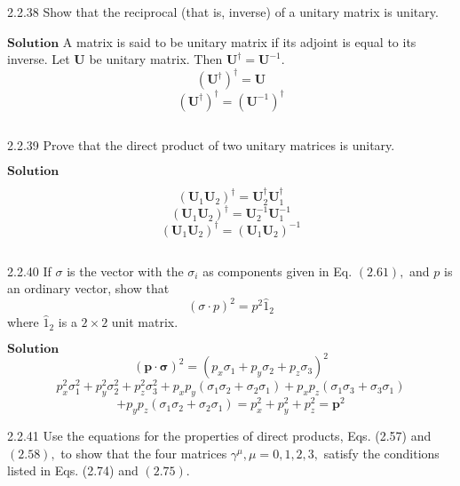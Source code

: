 \begin{mybox}{2.2.38}
Show that the reciprocal (that is, inverse) of a unitary matrix is unitary.
\end{mybox}


$\boxed{\textbf{Solution}}$ A matrix is said to be unitary matrix if its adjoint is equal to its inverse. Let $\mathbf{U}$ be unitary matrix. Then $\mathbf{U}^{\dagger}=\mathbf{U}^{-1}$.
$$\left( \mathbf{U}^{\dagger}\right)^{\dagger}=\mathbf{U}$$
$$\left( \mathbf{U}^{\dagger}\right)^{\dagger}=\left( \mathbf{U}^{-1}\right)^{\dagger}$$

$$$$

\begin{mybox}{2.2.39}
Prove that the direct product of two unitary matrices is unitary.
\end{mybox}

$\boxed{\textbf{Solution}}$ 

$$\left( \mathbf{U}_{1}  \mathbf{U}_{2}\right)^{\dagger}= \mathbf{U}_{2}^{\dagger}  \mathbf{U}_{1}^{\dagger}$$
$$\left( \mathbf{U}_{1}  \mathbf{U}_{2}\right)^{\dagger}= \mathbf{U}_{2}^{-1}  \mathbf{U}_{1}^{-1}$$
$$\left( \mathbf{U}_{1}  \mathbf{U}_{2}\right)^{\dagger}=\left( \mathbf{U}_{1}  \mathbf{U}_{2}\right)^{-1}$$

$$$$

\begin{mybox}{2.2.40}
If $\sigma$ is the vector with the $\sigma_{i}$ as components given in Eq. $(2.61),$ and $p$ is an ordinary vector, show that
$$(\sigma \cdot p)^{2}=p^{2} \hat{1}_{2}$$
where $\hat{1}_{2}$ is a $2 \times 2$ unit matrix.
\end{mybox}


$\boxed{\textbf{Solution}}$ 
$$(\mathbf{p} \cdot \boldsymbol{\sigma})^{2}=\left(p_{x} \sigma_{1}+p_{y} \sigma_{2}+p_{z} \sigma_{3}\right)^{2}$$
$$p_{x}^{2} \sigma_{1}^{2}+p_{y}^{2} \sigma_{2}^{2}+p_{z}^{2} \sigma_{3}^{2}+p_{x} p_{y}\left(\sigma_{1} \sigma_{2}+\sigma_{2} \sigma_{1}\right)+p_{x} p_{z}\left(\sigma_{1} \sigma_{3}+\sigma_{3} \sigma_{1}\right)$$
$$+p_{y} p_{z}\left(\sigma_{1} \sigma_{2}+\sigma_{2} \sigma_{1}\right)=p_{x}^{2}+p_{y}^{2}+p_{z}^{2}=\mathbf{p}^{2}$$

\newpage

\begin{mybox}{2.2.41}
Use the equations for the properties of direct products, Eqs. (2.57) and $(2.58),$ to show
that the four matrices $\gamma^{\mu}, \mu=0,1,2,3,$ satisfy the conditions listed in Eqs. (2.74) and $(2.75) .$
\end{mybox}


